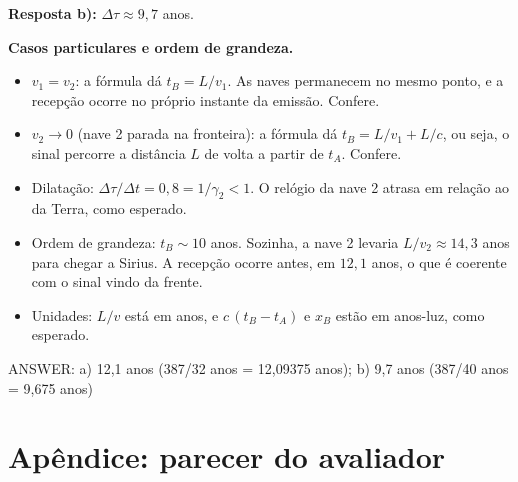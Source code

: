 \documentclass{article}%
\begin{document}
\textbf{Resposta b):} $\Delta\tau \approx 9{,}7$ anos.

\textbf{Casos particulares e ordem de grandeza.}
\begin{itemize}
\item $v_1 = v_2$: a fórmula dá $t_B = L/v_1$. As naves permanecem no mesmo ponto, e a recepção ocorre no próprio instante da emissão. Confere.
\item $v_2 \to 0$ (nave 2 parada na fronteira): a fórmula dá $t_B = L/v_1 + L/c$, ou seja, o sinal percorre a distância $L$ de volta a partir de $t_A$. Confere.
\item Dilatação: $\Delta\tau/\Delta t = 0{,}8 = 1/\gamma_2 < 1$. O relógio da nave 2 atrasa em relação ao da Terra, como esperado.
\item Ordem de grandeza: $t_B \sim 10$ anos. Sozinha, a nave 2 levaria $L/v_2 \approx 14{,}3$ anos para chegar a Sirius. A recepção ocorre antes, em $12{,}1$ anos, o que é coerente com o sinal vindo da frente.
\item Unidades: $L/v$ está em anos, e $c\,(t_B - t_A)$ e $x_B$ estão em anos-luz, como esperado.
\end{itemize}

ANSWER: a) 12,1 anos (387/32 anos = 12,09375 anos); b) 9,7 anos (387/40 anos = 9,675 anos)%
\newpage%
\section*{Apêndice: parecer do avaliador}%
\end{document}
